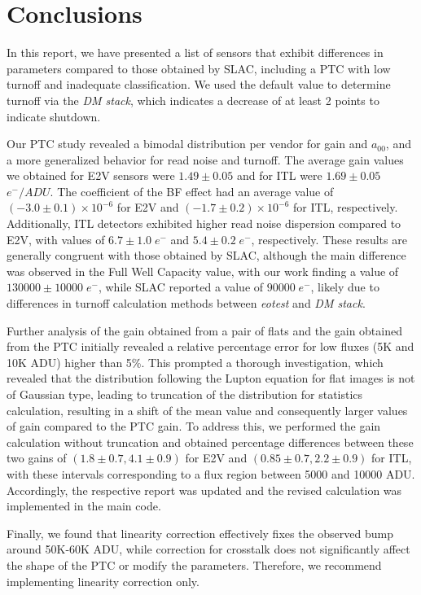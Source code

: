 \section{Conclusions} \label{sec:conclusions}
In this report, we have presented a list of sensors that exhibit differences in parameters compared to those obtained by SLAC, including a PTC with low turnoff and inadequate classification. We used the default value to determine turnoff via the \textit{DM stack}, which indicates a decrease of at least 2 points to indicate shutdown.

\vspace{3mm}
Our PTC study revealed a bimodal distribution per vendor for gain and $a_{00}$, and a more generalized behavior for read noise and turnoff. The average gain values we obtained for E2V sensors were $1.49 \pm 0.05$ and for ITL were $1.69 \pm 0.05$ $e^{-}/ADU$. The coefficient of the BF effect had an average value of $(-3.0 \pm 0.1) \times 10 ^{-6}$ for E2V and $(-1.7 \pm 0.2)\times 10 ^{-6}$ for ITL, respectively. Additionally, ITL detectors exhibited higher read noise dispersion compared to E2V, with values of $6.7 \pm 1.0 \; e^{-}$ and $5.4 \pm 0.2 \; e^{-}$, respectively. These results are generally congruent with those obtained by SLAC, although the main difference was observed in the Full Well Capacity value, with our work finding a value of $130000 \pm 10000 \; e^-$, while SLAC reported a value of $90000 \; e^-$, likely due to differences in turnoff calculation methods between \textit{eotest} and \textit{DM stack}.


\vspace{3mm}
Further analysis of the gain obtained from a pair of flats and the gain obtained from the PTC initially revealed a relative percentage error for low fluxes (5K and 10K ADU) higher than 5\%. This prompted a thorough investigation, which revealed that the distribution following the Lupton equation for flat images is not of Gaussian type, leading to truncation of the distribution for statistics calculation, resulting in a shift of the mean value and consequently larger values of gain compared to the PTC gain. To address this, we performed the gain calculation without truncation and obtained percentage differences between these two gains of $(1.8 \pm 0.7, 4.1 \pm 0.9)$ for E2V and $(0.85 \pm 0.7, 2.2 \pm 0.9)$ for ITL, with these intervals corresponding to a flux region between 5000 and 10000 ADU. Accordingly, the respective report was updated and the revised calculation was implemented in the main code.


\vspace{3mm}
Finally, we found that linearity correction effectively fixes the observed bump around 50K-60K ADU, while correction for crosstalk does not significantly affect the shape of the PTC or modify the parameters. Therefore, we recommend implementing linearity correction only.